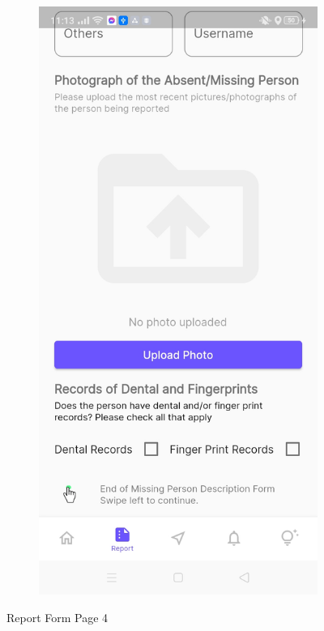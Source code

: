 \begin{figure}[!h]
\begin{subfigure}[c]{0.30\linewidth}
    \end{subfigure}
    \centering
    \begin{subfigure}[c]{0.30\linewidth}
        \centering
        \includegraphics[scale=0.15]{figures/Chapter4/Main/p4-4.jpg}
    \end{subfigure}
    \caption{Report Form Page 4}
    \label{fig:ReportPage4}
\end{figure}

